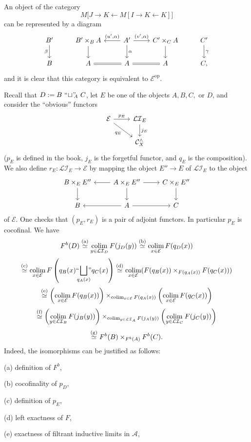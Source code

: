 \documentclass[12pt]{article}
\theoremstyle{remark}
\theoremstyle{definition}
\newcommand{\nn}{\noindent}
\newcommand{\cc}{\mathcal}
\newcommand{\A}{\mathcal A}
\newcommand{\C}{\mathcal C}
\DeclareMathOperator*{\col}{colim}
\DeclareMathOperator{\op}{op}
\begin{document}
An object of the category 
$$
M\big[J\to K\leftarrow M[I\to K\leftarrow K]\big]
$$ 
can be represented by a diagram 
$$
\begin{tikzcd}
B'\ar{d}[swap]{\beta}&B'\times_BA\ar{d}&A'\ar{l}[swap]{(u',\alpha)}\ar{r}{(v',\alpha)}\ar{d}{\alpha}&C'\times_CA\ar{d}&C'\ar{d}{\gamma}\\ 
B&A\ar[equal]{r}&A\ar[equal]{r}&A&C, 
\end{tikzcd}
$$ 
and it is clear that this category is equivalent to $\cc E^{\op}$. 

Recall that $D:=B\ ``\!\sqcup\!"\!\!_A\ C$, let $E$ be one of the objects $A,B,C,$ or $D$, and consider the ``obvious'' functors 
$$
\begin{tikzcd}
\cc E\ar{r}{p_E}\ar{rd}[swap]{q_E}&\cc{LI}_E\ar{d}{j_E}\\ 
{}&\C_X^\wedge
\end{tikzcd}
$$ 
($p_E$ is defined in the book, $j_E$ is the forgetful functor, and $q_E$ is the composition). We also define $r_E:\cc{LI}_E\to\cc E$ by mapping the object $E''\to E$ of $\cc{LI}_E$ to the object 
$$
\begin{tikzcd}
B\times_EE''\ar{d}&A\times_EE''\ar{l}\ar{r}\ar{d}&C\times_EE''\ar{d}\\ 
B&A\ar{r}\ar{l}&C
\end{tikzcd}
$$ 
of $\cc E$. One checks that $(p_E,r_E)$ is a pair of adjoint functors. In particular $p_E$ is cocofinal. We have
$$
F^b(D)
\overset{(\text a)}{\simeq}\col_{y\in\cc{LI}_D}F(j_D(y))
\overset{(\text b)}{\simeq}\col_{x\in\cc E}F(q_D(x))
$$
$$
\overset{(\text c)}{\simeq}\col_{x\in\cc E}F\left(q_B(x)``\!\!\!\bigsqcup_{q_A(x)}\!\!\!"q_C(x)\right)
\overset{(\text d)}{\simeq}\col_{x\in\cc E}(F(q_B(x))\times_{F(q_A(x))}F(q_C(x)))
$$
$$
\overset{(\text e)}{\simeq}\left(\col_{x\in\cc E}F(q_B(x))\right)\times_{\col_{x\in\cc E}F(q_A(x))}\left(\col_{x\in\cc E}F(q_C(x))\right)
$$ 
$$
\overset{(\text f)}{\simeq}\left(\col_{y\in\cc{LI}_B}F(j_B(y))\right)\times_{\col_{y\in\cc{LI}_A}F(j_A(y))}\left(\col_{y\in\cc{LI}_C}F(j_C(y))\right)
$$ 
$$
\overset{(\text g)}{\simeq}F^b(B)\times_{F^b(A)}F^b(C).
$$ 
Indeed, the isomorphisms can be justified as follows: 

\nn(a) definition of $F^b$, 

\nn(b) cocofinality of $p_D$,

\nn(c) definition of $p_E$, 

\nn(d) left exactness of $F$, 

\nn(e) exactness of filtrant inductive limits in $\A$, 
\end{document}
